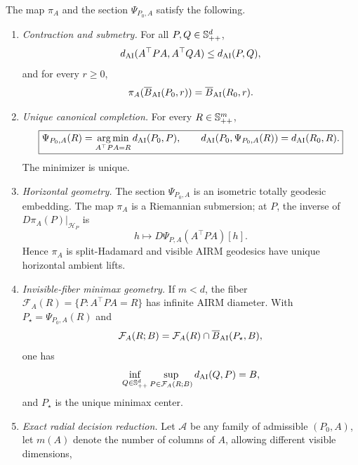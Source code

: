 \begin{theorem}
\label{thm:spd-compression}
The map \(\pi_A\) and the section \(\Psi_{P_0,A}\) satisfy the following.
\begin{enumerate}[label=(\Alph*),leftmargin=*]
  \item \emph{Contraction and submetry.}  For all \(P,Q\in\mathbb S_{++}^d\),
  \begin{equation}
    d_{\mathrm{AI}}(A^\top PA,A^\top QA)\le d_{\mathrm{AI}}(P,Q),
    \label{eq:spd-contraction}
  \end{equation}
  and for every \(r\ge0\),
  \begin{equation}
    \pi_A(\overline B_{\mathrm{AI}}(P_0,r))
    =\overline B_{\mathrm{AI}}(R_0,r).
    \label{eq:spd-ball-submetry}
  \end{equation}
  \item \emph{Unique canonical completion.}  For every \(R\in\mathbb S_{++}^m\),
  \begin{equation}
    \boxed{
    \Psi_{P_0,A}(R)
    =\operatorname*{arg\,min}_{A^\top PA=R}d_{\mathrm{AI}}(P_0,P),
    \qquad
    d_{\mathrm{AI}}(P_0,\Psi_{P_0,A}(R))=d_{\mathrm{AI}}(R_0,R).}
    \label{eq:spd-shortest-completion}
  \end{equation}
  The minimizer is unique.
  \item \emph{Horizontal geometry.}  The section \(\Psi_{P_0,A}\) is an
  isometric totally geodesic embedding.  The map \(\pi_A\) is a Riemannian
  submersion; at \(P\), the inverse of
  \(D\pi_A(P)|_{\mathcal H_P}\) is
  \begin{equation}
    h\longmapsto D\Psi_{P,A}(A^\top PA)[h].
    \label{eq:spd-horizontal-lift}
  \end{equation}
  Hence \(\pi_A\) is split-Hadamard and visible AIRM geodesics have unique
  horizontal ambient lifts.
  \item \emph{Invisible-fiber minimax geometry.}  If \(m<d\), the fiber
  \(\mathcal F_A(R)=\{P:A^\top PA=R\}\) has infinite AIRM diameter.  With
  \(P_\star=\Psi_{P_0,A}(R)\) and
  \[
    \mathcal F_A(R;B)
    =\mathcal F_A(R)\cap\overline B_{\mathrm{AI}}(P_\star,B),
  \]
  one has
  \begin{equation}
    \inf_{Q\in\mathbb S_{++}^d}\sup_{P\in\mathcal F_A(R;B)}d_{\mathrm{AI}}(Q,P)=B,
    \label{eq:spd-minimax}
  \end{equation}
  and \(P_\star\) is the unique minimax center.
  \item \emph{Exact radial decision reduction.}  Let \(\mathcal A\) be any
  family of admissible \((P_0,A)\), let \(m(A)\) denote the number of columns
  of \(A\), allowing different visible dimensions,

\end{enumerate}
\end{theorem}
